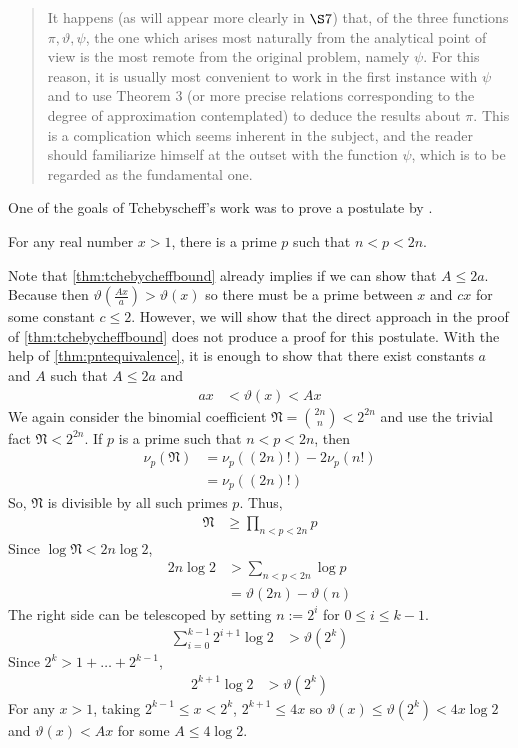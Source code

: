 \documentclass[elemannt.tex]{subfile}
\begin{document}
		\begin{quote}
			It happens (as will appear more clearly in $\S7$) that, of the three functions $\pi,\vartheta,\psi$, the one which arises most naturally from the analytical point of view is the most remote from the original problem, namely $\psi$. For this reason, it is usually most convenient to work in the first instance with $\psi$ and to use Theorem 3 (or more precise relations corresponding to the degree of approximation contemplated) to deduce the results about $\pi$. This is a complication which seems inherent in the subject, and the reader should familiarize himself at the outset with the function $\psi$, which is to be regarded as the fundamental one.
		\end{quote}
	One of the goals of Tchebyscheff's work was to prove a postulate by \textcite{bertrand_1845}.
		\begin{conjecture}\label{con:bertrand}
			For any real number $x>1$, there is a prime $p$ such that $n<p<2n$.
		\end{conjecture}
	Note that \autoref{thm:tchebycheffbound} already implies  if we can show that $A\leq 2a$. Because then $\vartheta\left(\frac{Ax}{a}\right)>\vartheta(x)$ so there must be a prime between $x$ and $cx$ for some constant $c\leq 2$. However, we will show that the direct approach in the proof of \autoref{thm:tchebycheffbound} does not produce a proof for this postulate.
			With the help of \autoref{thm:pntequivalence}, it is enough to show that there exist constants $a$ and $A$ such that $A\leq 2a$ and
				\begin{align*}
					ax
					& < \vartheta(x) < Ax
				\end{align*}
			We again consider the binomial coefficient $\mathfrak{N}=\binom{2n}{n}<2^{2n}$ and use the trivial fact $\mathfrak{N}<2^{2n}$. If $p$ is a prime such that $n<p<2n$, then
				\begin{align*}
					\nu_{p}(\mathfrak{N})
						& = \nu_{p}((2n)!)-2\nu_{p}(n!)\\
						& = \nu_{p}((2n)!)
				\end{align*}
			So, $\mathfrak{N}$ is divisible by all such primes $p$. Thus,
				\begin{align*}
					\mathfrak{N}
						& \geq \prod_{n<p<2n}p
				\end{align*}
			Since $\log{\mathfrak{N}}<2n\log{2}$,
				\begin{align*}
					2n\log{2}
						& > \sum_{n<p<2n}\log{p}\\
						& = \vartheta(2n)-\vartheta(n)
				\end{align*}
			The right side can be telescoped by setting $n:=2^{i}$ for $0\leq i\leq  k-1$.
				\begin{align*}
					\sum_{i=0}^{k-1}2^{i+1}\log{2}
						& > \vartheta(2^{k})
				\end{align*}
			Since $2^{k}>1+\ldots+2^{k-1}$,
				\begin{align*}
					2^{k+1}\log{2}
						& > \vartheta(2^{k})
				\end{align*}
			For any $x>1$, taking $2^{k-1}\leq x<2^{k}$, $2^{k+1}\leq 4x$ so $\vartheta(x)\leq\vartheta(2^{k})<4x\log{2}$ and $\vartheta(x)<Ax$ for some $A\leq 4\log{2}$.
\end{document}
